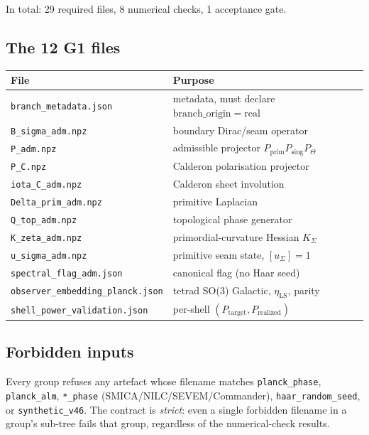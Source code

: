 In total: 29 required files, 8 numerical checks, 1 acceptance gate.

\subsection{The 12 G1 files}

\begin{center}
\small
\begin{tabular}{ll}
\toprule
File & Purpose \\
\midrule
\texttt{branch\_metadata.json}        & metadata, must declare \(\mathrm{branch\_origin}=\mathrm{real}\) \\
\texttt{B\_sigma\_adm.npz}            & boundary Dirac/seam operator \\
\texttt{P\_adm.npz}                   & admissible projector \(P_{\mathrm{prim}}P_{\mathrm{sing}}P_\Theta\) \\
\texttt{P\_C.npz}                     & Calderon polarisation projector \\
\texttt{iota\_C\_adm.npz}             & Calderon sheet involution \\
\texttt{Delta\_prim\_adm.npz}         & primitive Laplacian \\
\texttt{Q\_top\_adm.npz}              & topological phase generator \\
\texttt{K\_zeta\_adm.npz}             & primordial-curvature Hessian \(K_\Sigma\) \\
\texttt{u\_sigma\_adm.npz}            & primitive seam state, \([u_\Sigma]=1\) \\
\texttt{spectral\_flag\_adm.json}     & canonical flag (no Haar seed) \\
\texttt{observer\_embedding\_planck.json} & tetrad SO(3) Galactic, \(\eta_{\mathrm{LS}}\), parity \\
\texttt{shell\_power\_validation.json} & per-shell \((P_{\mathrm{target}},P_{\mathrm{realized}})\) \\
\bottomrule
\end{tabular}
\end{center}

\subsection{Forbidden inputs}

Every group refuses any artefact whose filename matches
\texttt{planck\_phase}, \texttt{planck\_alm}, \texttt{*\_phase}
(SMICA/NILC/SEVEM/Commander), \texttt{haar\_random\_seed}, or
\texttt{synthetic\_v46}.  The contract is \emph{strict}: even a single
forbidden filename in a group's sub-tree fails that group, regardless
of the numerical-check results.

